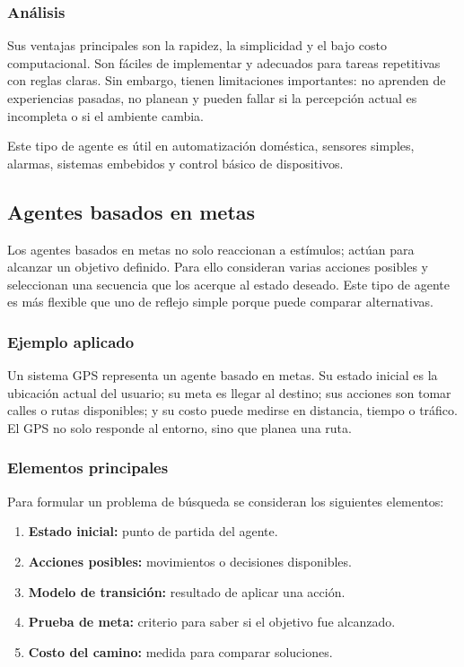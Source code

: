 \subsubsection{Análisis}

Sus ventajas principales son la rapidez, la simplicidad y el bajo costo computacional. Son fáciles de implementar y adecuados para tareas repetitivas con reglas claras. Sin embargo, tienen limitaciones importantes: no aprenden de experiencias pasadas, no planean y pueden fallar si la percepción actual es incompleta o si el ambiente cambia.

Este tipo de agente es útil en automatización doméstica, sensores simples, alarmas, sistemas embebidos y control básico de dispositivos.

\subsection{Agentes basados en metas}

Los agentes basados en metas no solo reaccionan a estímulos; actúan para alcanzar un objetivo definido. Para ello consideran varias acciones posibles y seleccionan una secuencia que los acerque al estado deseado. Este tipo de agente es más flexible que uno de reflejo simple porque puede comparar alternativas.

\subsubsection{Ejemplo aplicado}

Un sistema GPS representa un agente basado en metas. Su estado inicial es la ubicación actual del usuario; su meta es llegar al destino; sus acciones son tomar calles o rutas disponibles; y su costo puede medirse en distancia, tiempo o tráfico. El GPS no solo responde al entorno, sino que planea una ruta.

\subsubsection{Elementos principales}

Para formular un problema de búsqueda se consideran los siguientes elementos:

\begin{enumerate}
    \item \textbf{Estado inicial:} punto de partida del agente.
    \item \textbf{Acciones posibles:} movimientos o decisiones disponibles.
    \item \textbf{Modelo de transición:} resultado de aplicar una acción.
    \item \textbf{Prueba de meta:} criterio para saber si el objetivo fue alcanzado.
    \item \textbf{Costo del camino:} medida para comparar soluciones.
\end{enumerate}


